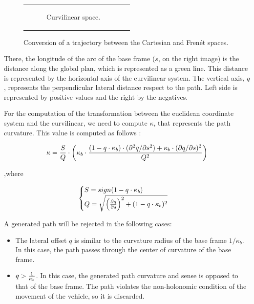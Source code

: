 \begin{figure}[h!]
\begin{tabular}{cc}
\begin{subfigure}[b]{0.45\textwidth}
    \caption{Curvilinear space.}
    \label{fig:cp07_justOneFrenet45}
  \end{subfigure}%
\end{tabular}
\caption{Conversion of a trajectory between the Cartesian and Frenét spaces.}\label{fig:cp07_euclidean_frenet_conversion}
\end{figure}

There, the longitude of the arc of the base frame ($s$, on the right image) is the distance along the global plan, which is represented as a green line. This distance is represented by the horizontal axis of the curvilinear system. The vertical axis, $q$, represents the perpendicular lateral distance respect to the path. Left side is represented by positive values and the right by the negatives.

For the computation of the transformation between the euclidean coordinate system and the curvilinear, we need to compute $\kappa$, that represents the path curvature. This value is computed as follows \citep{chu2012local, werling2010optimal, barfoot2004motion}:

\begin{equation}\label{eq:cp07_path_curvature}
 \kappa = {S \over Q} \cdot \left ( \kappa_b \cdot { 
 {(1 - q \cdot \kappa_b) \cdot (\partial^2q / \partial s^2) +
 \kappa_b \cdot (\partial q / \partial s )^2
 } 
 \over {Q^2} } \right )
\end{equation}

,where 

\begin{equation}\label{eq:cp07_path_curvature_s_and_q}
\begin{cases}
S=sign(1 - q \cdot \kappa_b)\\
Q=\sqrt{\left ( { {\partial q} \over {\partial s}} \right ) ^2+ (1 - q \cdot \kappa_b)^2}
\end{cases}
\end{equation}

A generated path will be rejected in the following cases:

\begin{itemize}
 \item The lateral offset $q$ is similar to the curvature radius of the base frame $1 / \kappa_b$. In this case, the path passes through the center of curvature of the base frame.
 \item $q > {1 \over \kappa_b}$. In this case, the generated path curvature and sense is opposed to that of the base frame. The path violates the non-holonomic condition of the movement of the vehicle, so it is discarded.
\end{itemize}


